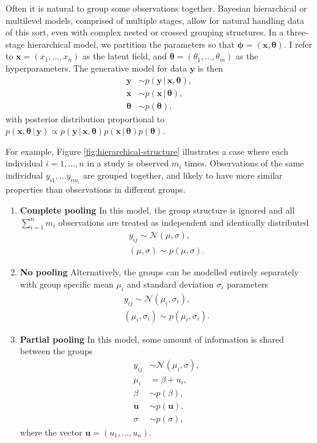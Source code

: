 \documentclass[a4paper, nobind]{templates/ociamthesis}
\providecommand{\tightlist}{%
  \setlength{\itemsep}{0pt}\setlength{\parskip}{0pt}}
\newcommand{\bu}{\mathbf{u}}
\newcommand{\x}{\mathbf{x}}
\newcommand{\y}{\mathbf{y}}
\newcommand{\bphi}{\bm{\phi}}
\newcommand{\btheta}{\bm{\theta}}
\begin{document}
Often it is natural to group some observations together.
Bayesian hierarchical or multilevel models, comprised of multiple stages, allow for natural handling data of this sort, even with complex nested or crossed grouping structures.
In a three-stage hierarchical model, we partition the parameters so that \(\bphi = (\x, \btheta)\).
I refer to \(\x = (x_1, \ldots, x_n)\) as the latent field, and \(\btheta = (\theta_1, \ldots, \theta_m)\) as the hyperparameters.
The generative model for data \(\y\) is then
\begin{align}
\y &\sim p(\y \, | \, \x, \btheta), \\
\x &\sim p(\x \, | \, \btheta), \\
\btheta &\sim p(\btheta),
\end{align}
with posterior distribution proportional to \(p(\x, \btheta \, | \, \y) \propto p(\y \, | \, \x, \btheta) p(\x \, | \, \btheta) p(\btheta)\).

For example, Figure \ref{fig:hierarchical-structure} illustrates a case where each individual \(i = 1, \ldots, n\) in a study is observed \(m_i\) times.
Observations of the same individual \(y_{i1}, \ldots y_{im_i}\) are grouped together, and likely to have more similar properties than observations in different groups.

\begin{enumerate}
\def\labelenumi{\arabic{enumi}.}
\tightlist
\item
  \textbf{Complete pooling} In this model, the group structure is ignored and all \(\sum_{i = 1}^n m_i\) observations are treated as independent and identically distributed
  \begin{align}
  y_{ij} \sim \mathcal{N}(\mu, \sigma), \\
  (\mu, \sigma) \sim p(\mu, \sigma).
  \end{align}
\item
  \textbf{No pooling} Alternatively, the groups can be modelled entirely separately with group specific mean \(\mu_i\) and standard deviation \(\sigma_i\) parameters
  \begin{align}
  y_{ij} \sim \mathcal{N}(\mu_i, \sigma_i), \\
  (\mu_i, \sigma_i) \sim p(\mu_i, \sigma_i).
  \end{align}
\item
  \textbf{Partial pooling} In this model, some amount of information is shared between the groups
  \begin{align}
  y_{ij} &\sim \mathcal{N}(\mu_i, \sigma), \\
  \mu_i &= \beta + u_i, \\
  \beta &\sim p(\beta), \\
  \bu &\sim p(\bu), \\
  \sigma &\sim p(\sigma),
  \end{align}
  where the vector \(\bu = (u_1, \ldots, u_n)\).
\end{enumerate}
\end{document}
